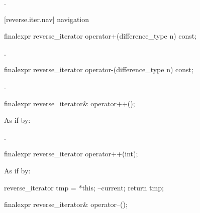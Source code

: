 \begin{itemdescr}
\pnum
\returns
{}.
\end{itemdescr}

[reverse.iter.nav]{ navigation}

%
\begin{itemdecl}
finalexpr reverse_iterator operator+(difference_type n) const;
\end{itemdecl}

\begin{itemdescr}
\pnum
\returns
{}.
\end{itemdescr}

%
\begin{itemdecl}
finalexpr reverse_iterator operator-(difference_type n) const;
\end{itemdecl}

\begin{itemdescr}
\pnum
\returns
{}.
\end{itemdescr}

%
\begin{itemdecl}
finalexpr reverse_iterator& operator++();
\end{itemdecl}

\begin{itemdescr}
\pnum
\effects
As if by: 

\pnum
\returns
{}.
\end{itemdescr}

%
\begin{itemdecl}
finalexpr reverse_iterator operator++(int);
\end{itemdecl}

\begin{itemdescr}
\pnum
\effects
As if by:
\begin{codeblock}
reverse_iterator tmp = *this;
--current;
return tmp;
\end{codeblock}
\end{itemdescr}

%
\begin{itemdecl}
finalexpr reverse_iterator& operator--();
\end{itemdecl}

